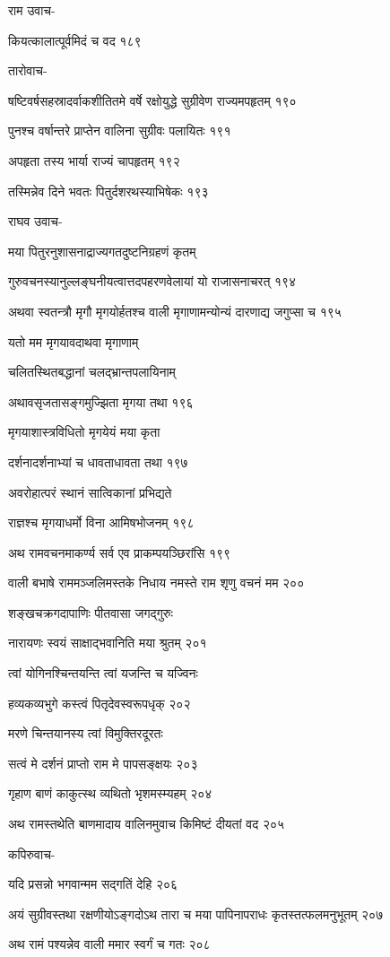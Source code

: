 राम उवाच-

कियत्कालात्पूर्वमिदं च वद १८९

तारोवाच-

षष्टिवर्षसहस्रादर्वाकशीतितमे वर्षे रक्षोयुद्धे सुग्रीवेण राज्यमपहृतम् १९०

पुनश्च वर्षान्तरे प्राप्तेन वालिना सुग्रीवः पलायितः १९१

अपहृता तस्य भार्या राज्यं चापहृतम् १९२

तस्मिन्नेव दिने भवतः पितुर्दशरथस्याभिषेकः १९३

राघव उवाच-

मया पितुरनुशासनाद्राज्यगतदुष्टनिग्रहणं कृतम्

गुरुवचनस्यानुल्लङ्घनीयत्वात्तदपहरणवेलायां यो राजासनाचरत् १९४

अथवा स्वतन्त्रौ मृगौ मृगयोर्हतश्च वाली मृगाणामन्योन्यं दारणाद्य जगुप्सा च १९५

यतो मम मृगयावदाथवा मृगाणाम्

चलितस्थितबद्धानां चलद्भ्रान्तपलायिनाम्

अथावसृजतासङ्गमुज्झिता मृगया तथा १९६

मृगयाशास्त्रविधितो मृगयेयं मया कृता

दर्शनादर्शनाभ्यां च धावताधावता तथा १९७

अवरोहात्परं स्थानं सात्विकानां प्रभिद्यते

राज्ञश्च मृगयाधर्मो विना आमिषभोजनम् १९८

अथ रामवचनमाकर्ण्य सर्व एव प्राकम्पयञ्छिरांसि १९९

वाली बभाषे राममञ्जलिमस्तके निधाय नमस्ते राम शृणु वचनं मम २००

शङ्खचक्रगदापाणिः पीतवासा जगद्गुरुः

नारायणः स्वयं साक्षाद्भवानिति मया श्रुतम् २०१

त्वां योगिनश्चिन्तयन्ति त्वां यजन्ति च यज्विनः

हव्यकव्यभुगे कस्त्वं पितृदेवस्वरूपधृक् २०२

मरणे चिन्तयानस्य त्वां विमुक्तिरदूरतः

सत्वं मे दर्शनं प्राप्तो राम मे पापसङ्क्षयः २०३

गृहाण बाणं काकुत्स्थ व्यथितो भृशमस्म्यहम् २०४

अथ रामस्तथेति बाणमादाय वालिनमुवाच किमिष्टं दीयतां वद २०५

कपिरुवाच-

यदि प्रसन्नो भगवान्मम सद्गतिं देहि २०६

अयं सुग्रीवस्तथा रक्षणीयोऽङ्गदोऽथ तारा च मया पापिनापराधः कृतस्तत्फलमनुभूतम् २०७

अथ रामं पश्यन्नेव वाली ममार स्वर्गं च गतः २०८

